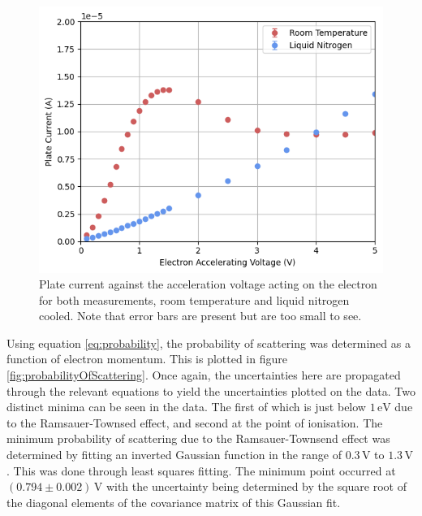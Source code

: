 \documentclass[%
reprint,
amsmath,amssymb,
aps,
floatfix
]{revtex4-2}
\begin{document}
	\begin{figure}
		\includegraphics[width=\columnwidth]{plateCurrentGraph.png}
		\caption{\label{fig:plateCurrentGraph}Plate current against the acceleration voltage acting on the electron for both measurements, room temperature and liquid nitrogen cooled. Note that error bars are present but are too small to see.}
	\end{figure}
	
	Using equation \ref{eq:probability}, the probability of scattering was determined as a function of electron momentum. This is plotted in figure \ref{fig:probabilityOfScattering}. Once again, the uncertainties here are propagated through the relevant equations to yield the uncertainties plotted on the data. Two distinct minima can be seen in the data. The first of which is just below $1 \,\text{eV}$ due to the Ramsauer-Townsed effect, and second at the point of ionisation. The minimum probability of scattering due to the Ramsauer-Townsend effect was determined by fitting an inverted Gaussian function in the range of $0.3 \,\text{V}$ to $1.3 \,\text{V}$. This was done through least squares fitting. The minimum point occurred at $(0.794 \pm 0.002) \,\text{V}$ with the uncertainty being determined by the square root of the diagonal elements of the covariance matrix of this Gaussian fit.\\ 
	
\end{document}
